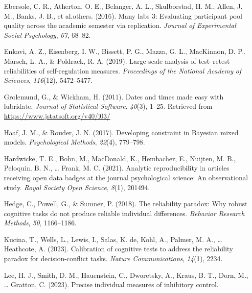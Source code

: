 \documentclass[
  man,floatsintext]{apa6}
\newlength{\cslhangindent}
\newlength{\cslentryspacingunit} %
\newenvironment{CSLReferences}[2] %
 {%
  \setlength{\parindent}{0pt}
  \ifodd #1
  \let\oldpar\par
  \def\par{\hangindent=\cslhangindent\oldpar}
  \fi
  \setlength{\parskip}{#2\cslentryspacingunit}
 }%
 {}
\begin{document}
\begin{CSLReferences}{1}{0}
\leavevmode{}%
Ebersole, C. R., Atherton, O. E., Belanger, A. L., Skulborstad, H. M., Allen, J. M., Banks, J. B., et al.others. (2016). Many labs 3: Evaluating participant pool quality across the academic semester via replication. \emph{Journal of Experimental Social Psychology}, \emph{67}, 68--82.

\leavevmode{}%
Enkavi, A. Z., Eisenberg, I. W., Bissett, P. G., Mazza, G. L., MacKinnon, D. P., Marsch, L. A., \& Poldrack, R. A. (2019). Large-scale analysis of test--retest reliabilities of self-regulation measures. \emph{Proceedings of the National Academy of Sciences}, \emph{116}(12), 5472--5477.

\leavevmode{}%
Grolemund, G., \& Wickham, H. (2011). Dates and times made easy with {lubridate}. \emph{Journal of Statistical Software}, \emph{40}(3), 1--25. Retrieved from \url{https://www.jstatsoft.org/v40/i03/}

\leavevmode{}%
Haaf, J. M., \& Rouder, J. N. (2017). Developing constraint in {B}ayesian mixed models. \emph{Psychological Methods}, \emph{22}(4), 779--798.

\leavevmode{}%
Hardwicke, T. E., Bohn, M., MacDonald, K., Hembacher, E., Nuijten, M. B., Peloquin, B. N., \ldots{} Frank, M. C. (2021). Analytic reproducibility in articles receiving open data badges at the journal psychological science: An observational study. \emph{Royal Society Open Science}, \emph{8}(1), 201494.

\leavevmode{}%
Hedge, C., Powell, G., \& Sumner, P. (2018). The reliability paradox: Why robust cognitive tasks do not produce reliable individual differences. \emph{Behavior Research Methods}, \emph{50}, 1166--1186.

\leavevmode{}%
Kucina, T., Wells, L., Lewis, I., Salas, K. de, Kohl, A., Palmer, M. A., \ldots{} Heathcote, A. (2023). Calibration of cognitive tests to address the reliability paradox for decision-conflict tasks. \emph{Nature Communications}, \emph{14}(1), 2234.

\leavevmode{}%
Lee, H. J., Smith, D. M., Hauenstein, C., Dworetsky, A., Kraus, B. T., Dorn, M., \ldots{} Gratton, C. (2023). Precise individual measures of inhibitory control.


\end{CSLReferences}
\end{document}

